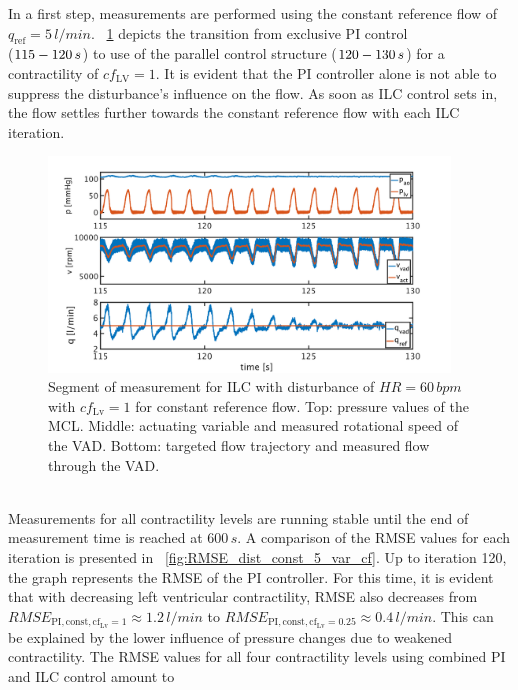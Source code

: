 In a first step, measurements are performed using the constant reference flow of $q_{\mathrm{ref}}=5\,l/min$. \figurename~\ref{fig:pi_to_ilc_dist_const_cf1} depicts the transition from exclusive PI control \\($115 \-- 120\,s$) to use of the parallel control structure ($120\--130\,s$) for a contractility of $cf_{\mathrm{LV}}=1$. It is evident that the PI controller alone is not able to suppress the disturbance's influence on the flow. As soon as ILC control sets in, the flow settles further towards the constant reference flow with each ILC iteration.
\begin{figure}[ht!]
  \centering
  \includegraphics[width=0.95\textwidth]{images/chapt_5/ILC/pi_to_ilc_dist_const_cf1.pdf}
  \caption[Segment of measurement for ILC with disturbance of $HR=60\,bpm$ with $cf_{\mathrm{Lv}}=1$ for constant reference flow]{Segment of measurement for ILC with disturbance of $HR=60\,bpm$ with $cf_{\mathrm{Lv}}=1$ for constant reference flow. Top:  pressure values of the MCL. Middle: actuating variable and measured rotational speed of the VAD. Bottom: targeted flow trajectory and measured flow through the VAD.}
  \label{fig:pi_to_ilc_dist_const_cf1}
\end{figure}
\\Measurements for all contractility levels are running stable until the end of measurement time is reached at $600\,s$. A comparison of the RMSE values for each iteration is presented in \figurename~\ref{fig:RMSE_dist_const_5_var_cf}.
Up to iteration 120, the graph represents the RMSE of the PI controller. For this time, it is evident that with decreasing left ventricular contractility, RMSE also decreases from $RMSE_{\mathrm{PI,const,cf_{Lv}=1}}\approx 1.2\, l/min$ to $RMSE_{\mathrm{PI,const,cf_{Lv}=0.25}}\approx 0.4\, l/min$. This can be explained by the lower influence of pressure changes due to weakened contractility. The RMSE values for all four contractility levels using combined PI and ILC control amount to
